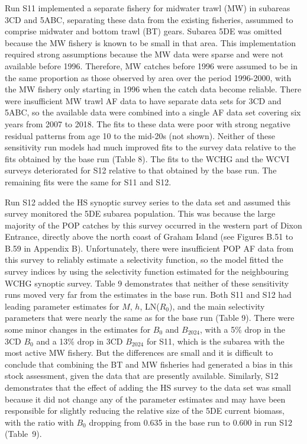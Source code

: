 \documentclass[11pt]{book}
\newcommand{\Bcurr}{B_{2024}}
\newcommand{\pc}{\%}
\begin{document}
Run S11 implemented a separate fishery for midwater trawl (MW) in subareas 3CD and 5ABC, separating these data from the existing fisheries, assummed to comprise midwater and bottom trawl (BT) gears. 
Subarea 5DE was omitted because the MW fishery is known to be small in that area. 
This implementation required strong assumptions because the MW data were sparse and were not available before 1996.
Therefore, MW catches before 1996 were assumed to be in the same proportion as those observed by area over the period 1996-2000, with the MW fishery only starting in 1996 when the catch data become reliable. 
There were insufficient MW trawl AF data to have separate data sets for 3CD and 5ABC, so the available data were combined into a single AF data set covering six years from 2007 to 2018. 
The fits to these data were poor with strong negative residual patterns from age 10 to the mid-20s (not shown). 
Neither of these sensitivity run models had much improved fits to the survey data relative to the fits obtained by the base run (Table 8).
The fits to the WCHG and the WCVI surveys deteriorated for S12 relative to that obtained by the base run. 
The remaining fits were the same for S11 and S12.

Run S12 added the HS synoptic survey series to the data set and assumed this survey monitored the 5DE subarea population. 
This was because the large majority of the POP catches by this survey occurred in the western part of Dixon Entrance, directly above the north coast of Graham Island (see Figures B.51 to B.59 in Appendix B). 
Unfortunately, there were insufficient POP AF data from this survey to reliably estimate a selectivity function, so the model fitted the survey indices by using the selectivity function estimated for the neighbouring WCHG synoptic survey.
Table 9 demonstrates that neither of these sensitivity runs moved very far from the estimates in the base run.
Both S11 and S12 had leading parameter estimates for $M$, $h$, LN($R_0$), and the main selectivity parameters that were nearly the same as for the base run (Table 9). 
There were some minor changes in the estimates for $B_0$ and $\Bcurr$, with a 5\pc{} drop in the 3CD $B_0$ and a 13\pc{} drop in 3CD $\Bcurr$ for S11, which is the subarea with the most active MW fishery. 
But the differences are small and it is difficult to conclude that combining the BT and MW fisheries had generated a bias in this stock assessment, given the data that are presently available. 
Similarly, S12 demonstrates that the effect of adding the HS survey to the data set was small because it did not change any of the parameter estimates and may have been responsible for slightly reducing the relative size of the 5DE current biomass, with the ratio with $B_0$ dropping from 0.635 in the base run to 0.600 in run S12 (Table~9).
\end{document}
